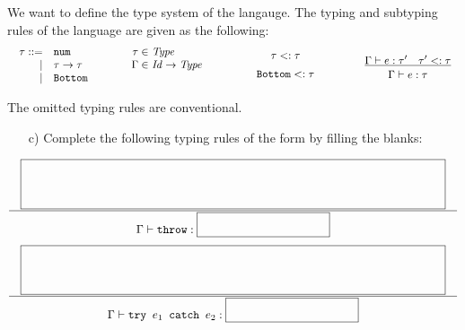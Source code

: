 \begin{enumerate}
We want to define the type system of the langauge.
The typing and subtyping rules of the language are given as the following:
\[
\begin{array}{ccccccc}
\begin{array}{rllr@{\hskip3pt}l}
\tau::= & \verb+num+&\qquad&\tau\in&\mathit{Type} \\
\mid& \tau\rightarrow\tau &&\Gamma\in&\mathit{Id}\rightarrow\mathit{Type}\\
\mid& \verb+Bottom+ \\
\end{array} &\qquad&
\begin{array}{c}
{\tau}<:{\tau} \\[5pt]
{\code{Bottom}}<:{\tau} 
\end{array}&\qquad&
\newinfrule
{ \typed{e}{\tau'} \rulesep {\tau'}<:{\tau} }
{ \typed{e}{\tau} }
\end{array}
\]

The omitted typing rules are conventional.

\begin{itemize}
\item[c)] Complete the following typing rules
of the form 
by filling the blanks:
\end{itemize}

{
\[
\newinfrule
{ \lblank }
{ \typed{\code{throw}}{\sblank} }
\]
\[
\newinfrule
{ \lblank }
{ \typed{\code{try }e_1\code{ catch }e_2}{\sblank} }
\]
}


\end{enumerate}
